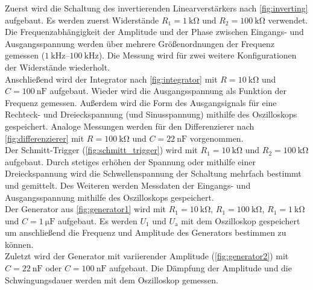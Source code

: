 Zuerst wird die Schaltung des invertierenden Linearverstärkers nach \autoref{fig:inverting} aufgebaut.
Es werden zuerst Widerstände $R_1 = \qty{1}{\kilo\ohm}$ und $R_2 = \qty{100}{\kilo\ohm}$ verwendet. Die Frequenzabhängigkeit der Amplitude und der Phase zwischen Eingangs- und 
Ausgangsspannung werden über mehrere Größenordnungen der Frequenz gemessen ($\qtyrange[range-phrase = -]{1}{100}{\kilo\hertz}$).
Die Messung wird für zwei weitere Konfigurationen der Widerstände wiederholt. \\
Anschließend wird der Integrator nach \autoref{fig:integrator} mit $R = \qty{10}{\kilo\ohm}$ und $C = \qty{100}{\nano\farad}$ aufgebaut. Wieder wird die Ausgangsspannung als
Funktion der Frequenz gemessen. Außerdem wird die Form des Ausgangsignals für eine Rechteck- und Dreieckspannung (und Sinusspannung) mithilfe des Oszilloskops gespeichert. 
Analoge Messungen werden für den Differenzierer nach \autoref{fig:differenzierer} mit $R = \qty{100}{\kilo\ohm}$ und $C = \qty{22}{\nano\farad}$ vorgenommen. \\
Der Schmitt-Trigger (\autoref{fig:schmitt_trigger}) wird mit $R_1 = \qty{10}{\kilo\ohm}$ und $R_2 = \qty{100}{\kilo\ohm}$ aufgebaut. Durch stetiges erhöhen der Spannung oder 
mithilfe einer Dreieckspannung wird die Schwellenspannung der Schaltung mehrfach bestimmt und gemittelt. Des Weiteren werden Messdaten der Eingangs- und Ausgangsspannung mithilfe 
des Oszilloskops gespeichert. \\
Der Generator aus \autoref{fig:generator1} wird mit $R_1 = \qty{10}{\kilo\ohm}$, $R_1 = \qty{100}{\kilo\ohm}$, $R_1 = \qty{1}{\kilo\ohm}$ und $C = \qty{1}{\micro\farad}$
aufgebaut. Es werden $U_1$ und $U_\text{a}$ mit dem Oszilloskop gespeichert um anschließend die Frequenz und Amplitude des Generators bestimmen zu können. \\
Zuletzt wird der Generator mit variierender Amplitude (\autoref{fig:generator2}) mit  $C = \qty{22}{\nano\farad}$ oder $C = \qty{100}{\nano\farad}$ aufgebaut.
Die Dämpfung der Amplitude und die Schwingungsdauer werden mit dem Oszilloskop gemessen.
